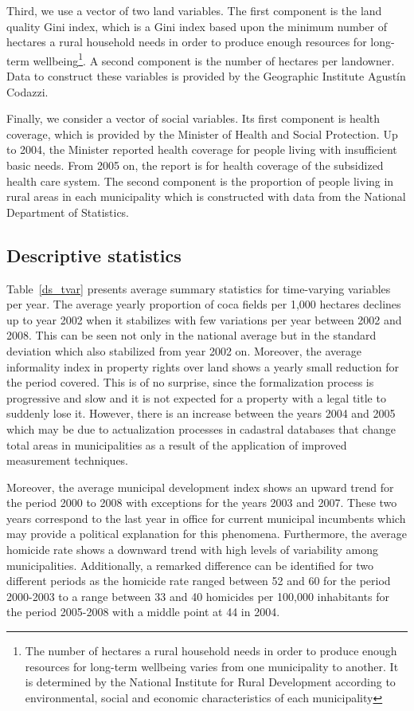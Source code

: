 \documentclass[12pt,a4paper,english]{article}%
\begin{document}
Third, we use a vector of two land variables. The first component is the land quality Gini index, which is a Gini index based upon the minimum number of hectares a rural household needs in order to produce enough resources for long-term wellbeing\footnote{The number of hectares a rural household needs in order to produce enough resources for long-term wellbeing varies from one municipality to another. It is determined by the National Institute for Rural Development according to environmental, social and economic characteristics of each municipality}. A second component is the number of hectares per landowner. Data to construct these variables is provided by the Geographic Institute Agust\'{i}n Codazzi.

Finally, we consider a vector of social variables. Its first component is health coverage, which is provided by the Minister of Health and Social Protection. Up to 2004, the Minister reported health coverage for people living with insufficient basic needs. From 2005 on, the report is for health coverage of the subsidized health care system. The second component is the proportion of people living in rural areas in each municipality which is constructed with data from the National Department of Statistics.

\subsection{Descriptive statistics}
\label{descriptive}

Table~\ref{ds_tvar} presents average summary statistics for time-varying variables per year. The average yearly proportion of coca fields per 1,000 hectares declines up to year 2002 when it stabilizes with few variations per year between 2002 and 2008. This can be seen not only in the national average but in the standard deviation which also stabilized from year 2002 on. Moreover, the average informality index in property rights over land shows a yearly small reduction for the period covered. This is of no surprise, since the formalization process is progressive and slow and it is not expected for a property with a legal title to suddenly lose it. However, there is an increase between the years 2004 and 2005 which may be due to actualization processes in cadastral databases that change total areas in municipalities as a result of the application of improved measurement techniques.

Moreover, the average municipal development index shows an upward trend for the period 2000 to 2008 with exceptions for the years 2003 and 2007. These two years correspond to the last year in office for current municipal incumbents which may provide a political explanation for this phenomena. Furthermore, the average homicide rate shows a downward trend with high levels of variability among municipalities. Additionally, a remarked difference can be identified for two different periods as the homicide rate ranged between 52 and 60 for the period 2000-2003 to a range between 33 and 40 homicides per 100,000 inhabitants for the period 2005-2008 with a middle point at 44 in 2004.
\end{document}
